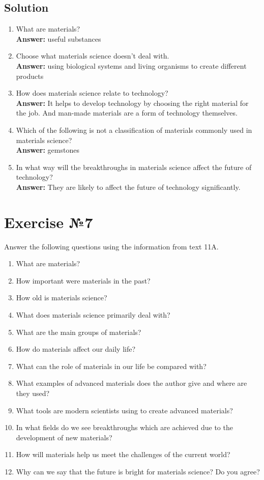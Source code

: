 \subsection*{Solution}
\begin{enumerate}
      \item What are materials? \\
            \textbf{Answer:}  useful substances
      \item Choose what materials science doesn’t deal with. \\
            \textbf{Answer:}  using biological systems and living organisms to create different products
      \item How does materials science relate to technology? \\
            \textbf{Answer:}  It helps to develop technology by choosing the right material for the job. And man-made materials are a form of technology themselves.
      \item Which of the following is not a classification of materials commonly used in materials science? \\
            \textbf{Answer:}  gemstones
      \item In what way will the breakthroughs in materials science affect the future of technology? \\
            \textbf{Answer:}  They are likely to affect the future of technology significantly.
\end{enumerate}

\section{Exercise №7}

Answer the following questions using the information from text 11A.
\begin{enumerate}
      \item What are materials?
      \item How important were materials in the past?
      \item How old is materials science?
      \item What does materials science primarily deal with?
      \item What are the main groups of materials?
      \item How do materials affect our daily life?
      \item What can the role of materials in our life be compared with?
      \item What examples of advanced materials does the author give and where are they used?
      \item What tools are modern scientists using to create advanced materials?
      \item In what fields do we see breakthroughs which are achieved due to the development of new materials?
      \item How will materials help us meet the challenges of the current world?
      \item Why can we say that the future is bright for materials science? Do you agree?
\end{enumerate}

